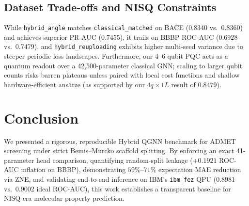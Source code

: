 \documentclass[conference]{IEEEtran}
\begin{document}
\subsection{Dataset Trade-offs and NISQ Constraints}
While \texttt{hybrid\_angle} matches \texttt{classical\_matched} on BACE ($0.8340$ vs.\ $0.8360$) and achieves superior PR-AUC ($0.7455$), it trails on BBBP ROC-AUC ($0.6928$ vs.\ $0.7479$), and \texttt{hybrid\_reuploading} exhibits higher multi-seed variance due to steeper periodic loss landscapes. Furthermore, our 4--6 qubit PQC acts as a quantum readout over a 42,500-parameter classical GNN; scaling to larger qubit counts risks barren plateaus \cite{mcclean2018barren} unless paired with local cost functions and shallow hardware-efficient ans\"{a}tze (as supported by our $4q \times 1L$ result of $0.8479$).

\section{Conclusion}
We presented a rigorous, reproducible Hybrid QGNN benchmark for ADMET screening under strict Bemis--Murcko scaffold splitting. By enforcing an exact 41-parameter head comparison, quantifying random-split leakage ($+0.1921$ ROC-AUC inflation on BBBP), demonstrating $59\%$--$71\%$ expectation MAE reduction via ZNE, and validating end-to-end inference on IBM's \texttt{ibm\_fez} QPU ($0.8981$ vs.\ $0.9002$ ideal ROC-AUC), this work establishes a transparent baseline for NISQ-era molecular property prediction.



\end{document}

